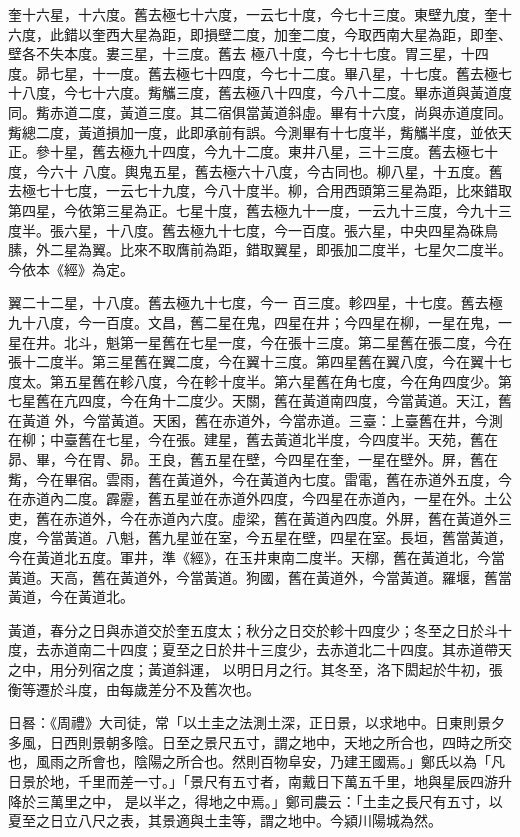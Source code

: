 \begin{pinyinscope}
 奎十六星，十六度。舊去極七十六度，一云七十度，今七十三度。東壁九度，奎十六度，此錯以奎西大星為距，即損壁二度，加奎二度，今取西南大星為距，即奎、壁各不失本度。婁三星，十三度。舊去
 極八十度，今七十七度。胃三星，十四度。昴七星，十一度。舊去極七十四度，今七十二度。畢八星，十七度。舊去極七十八度，今七十六度。觜觿三度，舊去極八十四度，今八十二度。畢赤道與黃道度同。觜赤道二度，黃道三度。其二宿俱當黃道斜虛。畢有十六度，尚與赤道度同。觜總二度，黃道損加一度，此即承前有誤。今測畢有十七度半，觜觿半度，並依天正。參十星，舊去極九十四度，今九十二度。東井八星，三十三度。舊去極七十度，今六十
 八度。輿鬼五星，舊去極六十八度，今古同也。柳八星，十五度。舊去極七十七度，一云七十九度，今八十度半。柳，合用西頭第三星為距，比來錯取第四星，今依第三星為正。七星十度，舊去極九十一度，一云九十三度，今九十三度半。張六星，十八度。舊去極九十七度，今一百度。張六星，中央四星為硃鳥膆，外二星為翼。比來不取膺前為距，錯取翼星，即張加二度半，七星欠二度半。今依本《經》為定。



 翼二十二星，十八度。舊去極九十七度，今一
 百三度。軫四星，十七度。舊去極九十八度，今一百度。文昌，舊二星在鬼，四星在井；今四星在柳，一星在鬼，一星在井。北斗，魁第一星舊在七星一度，今在張十三度。第二星舊在張二度，今在張十二度半。第三星舊在翼二度，今在翼十三度。第四星舊在翼八度，今在翼十七度太。第五星舊在軫八度，今在軫十度半。第六星舊在角七度，今在角四度少。第七星舊在亢四度，今在角十二度少。天關，舊在黃道南四度，今當黃道。天江，舊在黃道
 外，今當黃道。天囷，舊在赤道外，今當赤道。三臺：上臺舊在井，今測在柳；中臺舊在七星，今在張。建星，舊去黃道北半度，今四度半。天苑，舊在昴、畢，今在胃、昴。王良，舊五星在壁，今四星在奎，一星在壁外。屏，舊在觜，今在畢宿。雲雨，舊在黃道外，今在黃道內七度。雷電，舊在赤道外五度，今在赤道內二度。霹靂，舊五星並在赤道外四度，今四星在赤道內，一星在外。土公吏，舊在赤道外，今在赤道內六度。虛梁，舊在黃道內四度。外屏，舊在黃道外三
 度，今當黃道。八魁，舊九星並在室，今五星在壁，四星在室。長垣，舊當黃道，今在黃道北五度。軍井，準《經》，在玉井東南二度半。天槨，舊在黃道北，今當黃道。天高，舊在黃道外，今當黃道。狗國，舊在黃道外，今當黃道。羅堰，舊當黃道，今在黃道北。



 黃道，春分之日與赤道交於奎五度太；秋分之日交於軫十四度少；冬至之日於斗十度，去赤道南二十四度；夏至之日於井十三度少，去赤道北二十四度。其赤道帶天之中，用分列宿之度；黃道斜運，
 以明日月之行。其冬至，洛下閎起於牛初，張衡等遷於斗度，由每歲差分不及舊次也。



 日晷：《周禮》大司徒，常「以土圭之法測土深，正日景，以求地中。日東則景夕多風，日西則景朝多陰。日至之景尺五寸，謂之地中，天地之所合也，四時之所交也，風雨之所會也，陰陽之所合也。然則百物阜安，乃建王國焉。」鄭氏以為「凡日景於地，千里而差一寸。」「景尺有五寸者，南戴日下萬五千里，地與星辰四游升降於三萬里之中，
 是以半之，得地之中焉。」鄭司農云：「土圭之長尺有五寸，以夏至之日立八尺之表，其景適與土圭等，謂之地中。今潁川陽城為然。




\end{pinyinscope}
